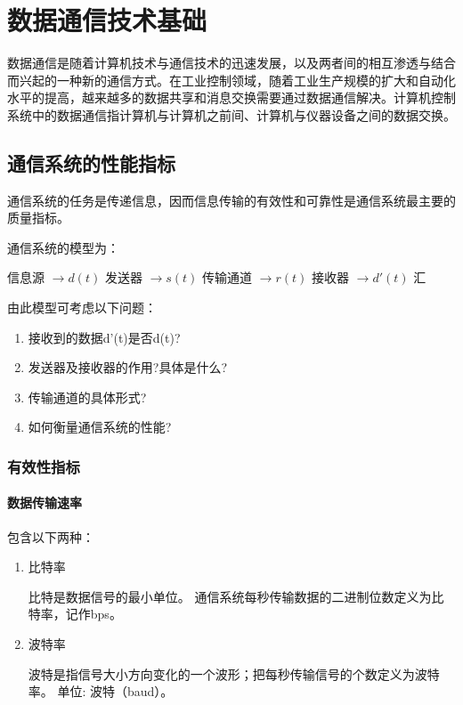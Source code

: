 \setcounter{chapter}{4}
\chapter{数据通信技术基础}

数据通信是随着计算机技术与通信技术的迅速发展，以及两者间的相互渗透与结合而兴起的一种新的通信方式。在工业控制领域，随着工业生产规模的扩大和自动化水平的提高，越来越多的数据共享和消息交换需要通过数据通信解决。计算机控制系统中的数据通信指计算机与计算机之前间、计算机与仪器设备之间的数据交换。


\section{通信系统的性能指标}

通信系统的任务是传递信息，因而信息传输的有效性和可靠性是通信系统最主要的质量指标。


通信系统的模型为：


信息源 $\rightarrow d(t)$ 发送器 $\rightarrow s(t)$ 传输通道 $\rightarrow r(t)$  接收器 $\rightarrow d'(t)$  汇

\begin{remark}
由此模型可考虑以下问题：

\begin{enumerate}
  \item 接收到的数据d'(t)是否d(t)?
  \item 发送器及接收器的作用?具体是什么?
  \item 传输通道的具体形式?
  \item 如何衡量通信系统的性能?
\end{enumerate}

\end{remark}

\subsection{有效性指标}

\subsubsection{数据传输速率}

 包含以下两种：
  \begin{enumerate}
    \item 比特率

比特是数据信号的最小单位。
    通信系统每秒传输数据的二进制位数定义为比特率，记作bps。
    \item 波特率

波特是指信号大小方向变化的一个波形；把每秒传输信号的个数定义为波特率。
    单位: 波特（baud）。
  \end{enumerate}

